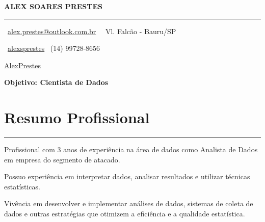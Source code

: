 \documentclass[10pt]{article}
\begin{document}

{\large\bf ALEX SOARES PRESTES \hfill} %
 
\vspace{-5pt}
\rule{\linewidth}{1pt}

{\faEnvelope \ \href{mailto:alex.prestes@outlook.com.br}{alex.prestes@outlook.com.br} \ \hfill \faHome \ Vl. Falcão - Bauru/SP}

{\faLinkedinSquare \ \href{https://www.linkedin.com/in/alexsprestes/}{alexsprestes} \hfill \faWhatsapp \ (14) 99728-8656 }

{\faGithub \href{https://github.com/AlexPrestes/}{ AlexPrestes} \hfill }



\vspace{5pt}
\centerline{\large\bf Objetivo: Cientista de Dados}
\vspace{-3pt}
\section*{Resumo Profissional}
\vspace{-15pt}
\rule{\linewidth}{1pt}

Profissional com 3 anos de experiência na área de dados como Analista de Dados em empresa do segmento de atacado.\\
\vspace{-5pt}

Possuo experiência em interpretar dados, analisar resultados e utilizar técnicas estatísticas.\\
\vspace{-5pt}

Vivência em desenvolver e implementar análises de dados, sistemas de coleta de dados e outras estratégias que otimizem a eficiência e a qualidade estatística.\\
\vspace{-5pt}
\end{document}
